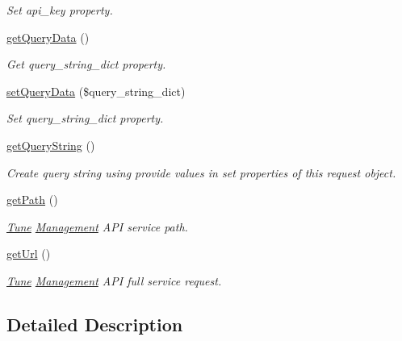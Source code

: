 \begin{DoxyCompactItemize}
\begin{DoxyCompactList}\small\item\em Set api\-\_\-key property. \end{DoxyCompactList}\item 
\hyperlink{classTune_1_1Management_1_1Service_1_1Request_afeaad811cb1ccb4fc1c2c0e4a013a1c9}{get\-Query\-Data} ()
\begin{DoxyCompactList}\small\item\em Get query\-\_\-string\-\_\-dict property. \end{DoxyCompactList}\item 
\hyperlink{classTune_1_1Management_1_1Service_1_1Request_a91f0f706e5df4e3ae3643f71c56c96f2}{set\-Query\-Data} (\$query\-\_\-string\-\_\-dict)
\begin{DoxyCompactList}\small\item\em Set query\-\_\-string\-\_\-dict property. \end{DoxyCompactList}\item 
\hyperlink{classTune_1_1Management_1_1Service_1_1Request_a700d91e11922d7f20dd811e49d4debc2}{get\-Query\-String} ()
\begin{DoxyCompactList}\small\item\em Create query string using provide values in set properties of this request object. \end{DoxyCompactList}\item 
\hyperlink{classTune_1_1Management_1_1Service_1_1Request_a635f33cd3e6f12e2552cc084a91aa8e5}{get\-Path} ()
\begin{DoxyCompactList}\small\item\em \hyperlink{namespaceTune}{Tune} \hyperlink{namespaceTune_1_1Management}{Management} A\-P\-I service path. \end{DoxyCompactList}\item 
\hyperlink{classTune_1_1Management_1_1Service_1_1Request_a276ccafbaad2ef8dc2ba64d2ab01be3e}{get\-Url} ()
\begin{DoxyCompactList}\small\item\em \hyperlink{namespaceTune}{Tune} \hyperlink{namespaceTune_1_1Management}{Management} A\-P\-I full service request. \end{DoxyCompactList}\end{DoxyCompactItemize}


\subsection{Detailed Description}


